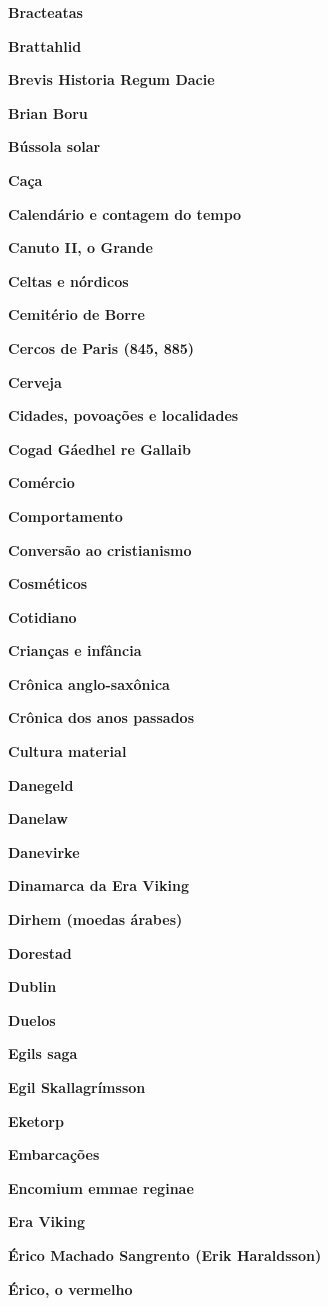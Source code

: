 \textbf{Bracteatas}

\textbf{Brattahlid}

\textbf{Brevis Historia Regum Dacie}

\textbf{Brian Boru}

\textbf{Bússola solar}

\textbf{Caça}

\textbf{Calendário e contagem do tempo}

\textbf{Canuto II, o Grande}

\textbf{Celtas e nórdicos}

\textbf{Cemitério de Borre}

\textbf{Cercos de Paris (845, 885)}

\textbf{Cerveja}

\textbf{Cidades, povoações e localidades}

\textbf{Cogad Gáedhel re Gallaib}

\textbf{Comércio}

\textbf{Comportamento}

\textbf{Conversão ao cristianismo}

\textbf{Cosméticos}

\textbf{Cotidiano}

\textbf{Crianças e infância}

\textbf{Crônica anglo-saxônica}

\textbf{Crônica dos anos passados}

\textbf{Cultura material}

\textbf{Danegeld}

\textbf{Danelaw}

\textbf{Danevirke}

\textbf{Dinamarca da Era Viking}

\textbf{Dirhem (moedas árabes)}

\textbf{Dorestad}

\textbf{Dublin}

\textbf{Duelos}

\textbf{Egils saga}

\textbf{Egil Skallagrímsson}

\textbf{Eketorp}

\textbf{Embarcações}

\textbf{Encomium emmae reginae}

\textbf{Era Viking}

\textbf{Érico Machado Sangrento (Erik Haraldsson)}

\textbf{Érico, o vermelho}

